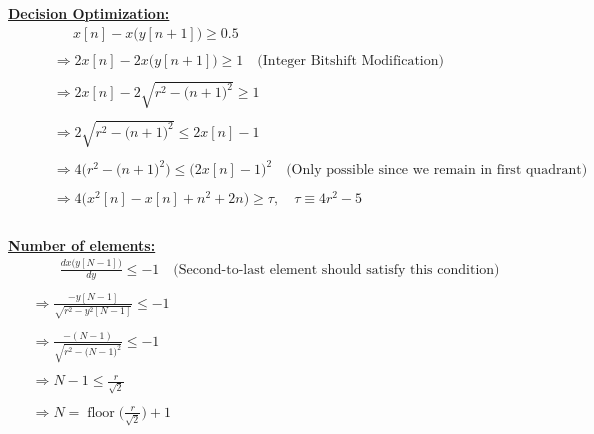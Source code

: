 \documentclass{article}
\DeclareMathOperator{\floor}{floor}
\begin{document}
\underline{\textbf{Decision Optimization:}}
\begin{align*}
    &\quad \quad \quad \ \ x[n] - x\Big(y[n + 1]\Big) \geq 0.5 \\ \\
    &\quad \quad \Rightarrow 2x[n] - 2x\Big(y[n + 1]\Big) \geq 1 \quad \big(\text{Integer Bitshift Modification}\big) \\ \\
    &\quad \quad \Rightarrow 2x[n] - 2\sqrt{r^{2} - \big(n + 1\big)^{2}} \geq 1 \\ \\
    &\quad \quad \Rightarrow 2\sqrt{r^{2} - \big(n + 1\big)^{2}} \leq 2x[n] - 1 \\ \\
    &\quad \quad \Rightarrow 4\Big(r^{2} - \big(n + 1\big)^{2}\Big) \leq \Big(2x[n] - 1\Big)^{2} \quad \big(\text{Only possible since we remain in first quadrant}\big) \\ \\
    &\quad \quad \Rightarrow 4\Big(x^{2}[n] - x[n] + n^{2} + 2n\Big) \geq \tau, \quad \tau \equiv 4r^{2} - 5 \\ \\
\end{align*}

\underline{\textbf{Number of elements:}}
\begin{align*}
    &\quad \quad \frac{dx\Big(y[N - 1]\Big)}{dy} \leq -1 \quad \big(\text{Second-to-last element should satisfy this condition}\big) \\ \\
    &\Rightarrow \frac{-y[N - 1]}{\sqrt{r^{2} - y^{2}[N - 1]}} \leq -1 \\ \\
    &\Rightarrow \frac{-(N - 1)}{\sqrt{r^{2} - \big(N - 1\big)^{2}}} \leq -1 \\ \\
    &\Rightarrow N - 1 \leq \frac{r}{\sqrt{2}} \\ \\
    &\Rightarrow N = \floor\Bigg(\frac{r}{\sqrt{2}}\Bigg) + 1\\ \\
\end{align*}
\end{document}
